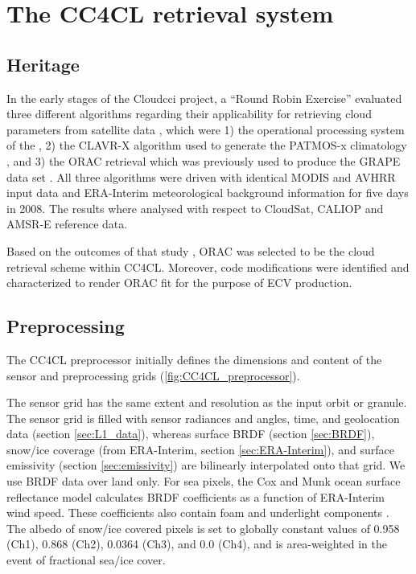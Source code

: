 \section{The CC4CL retrieval system}\label{processing_chain}

\subsection{Heritage}

In the early stages of the Cloud\textunderscore cci project, a ``Round Robin Exercise'' evaluated three different algorithms regarding their applicability for retrieving cloud parameters from satellite data \citep{Stengel15}, which were 1) the operational processing system of the \citet{CMSAF_web}, 2) the CLAVR-X algorithm used to generate the PATMOS-x climatology \citep{Heidinger13}, and 3) the ORAC retrieval which was previously used to produce the GRAPE data set \citep{Thomas09_GRAPE, GRAPE_web}. All three algorithms were driven with identical MODIS and AVHRR input data and ERA-Interim meteorological background information for five days in 2008. The results where analysed with respect to CloudSat, CALIOP and AMSR-E reference data. 

Based on the outcomes of that study \citep{Stengel15}, ORAC was selected to be the cloud retrieval scheme within CC4CL. Moreover, code modifications were identified and characterized to render ORAC fit for the purpose of ECV production. 

\subsection{Preprocessing}

The CC4CL preprocessor initially defines the dimensions and content of the sensor and preprocessing grids (\autoref{fig:CC4CL_preprocessor}). 

The sensor grid has the same extent and resolution as the input orbit or granule. The sensor grid is filled with sensor radiances and angles, time, and geolocation data (section \ref{sec:L1_data}), whereas surface BRDF (section \ref{sec:BRDF}), snow/ice coverage (from ERA-Interim, section \ref{sec:ERA-Interim}), and surface emissivity (section \ref{sec:emissivity}) are bilinearly interpolated onto that grid. We use BRDF data over land only. For sea pixels, the Cox and Munk ocean surface reflectance model calculates BRDF coefficients as a function of ERA-Interim wind speed. These coefficients also contain foam and underlight components \citep{Sayer10}. The albedo of snow/ice covered pixels is set to globally constant values of 0.958 (Ch1), 0.868 (Ch2), 0.0364 (Ch3), and 0.0 (Ch4), and is area-weighted in the event of fractional sea/ice cover.

